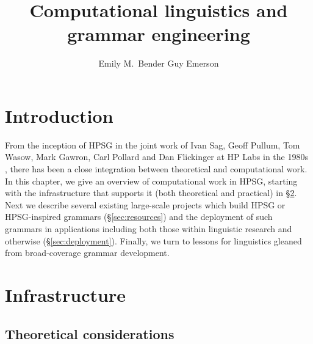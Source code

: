 \documentclass[output=paper]{langsci/langscibook}
\author{%
	Emily M.\ Bender\affiliation{University of Washington}
	\lastand Guy Emerson\affiliation{University of Cambridge}
}
\title{Computational linguistics and grammar engineering}
\begin{document}


\section{Introduction}


From the inception of HPSG in the joint work of Ivan Sag, Geoff Pullum, Tom Wasow, Mark Gawron, Carl Pollard and Dan Flickinger at HP Labs in the 1980s \cite{FIXME-CLobit-or-other}, there has been a close integration between theoretical and computational work. In this chapter, we give an overview of computational work in HPSG, starting with the infrastructure that supports it (both theoretical and practical) in \S\ref{sec:infrastructure}. Next we describe several existing large-scale projects which build HPSG or HPSG-inspired grammars (\S\ref{sec:resources}) and the deployment of such grammars in applications including both those within linguistic research and otherwise (\S\ref{sec:deployment}).  Finally, we turn to lessons for linguistics gleaned from broad-coverage grammar development.



\section{Infrastructure}
\label{sec:infrastructure}


\subsection{Theoretical considerations}
\label{sec:theoretical}
\end{document}
